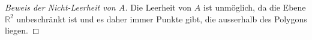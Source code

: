 \begin{proof}[Beweis der Nicht-Leerheit von $A$\label{jordan:beweis:nicht_leerheit_aussen}]
    Die Leerheit von $A$ ist unmöglich, da die Ebene $\mathbb{R}^2$ unbeschränkt ist und es daher immer Punkte gibt, die ausserhalb des Polygons liegen.
\end{proof}